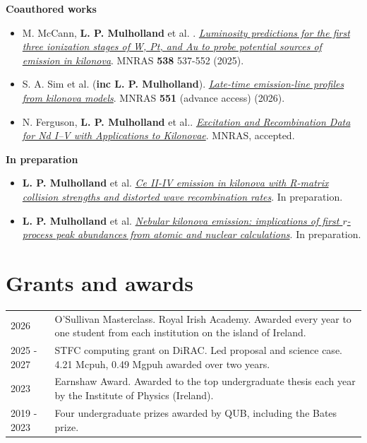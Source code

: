 \documentclass[a4paper,11pt]{article}
\begin{document}
\textbf{Coauthored works}
\begin{itemize}[label=,leftmargin=0.1cm]
    	\item {M. McCann}, \textbf{ L. P. Mulholland} et al. . \href{https://doi.org/10.1093/mnras/stae2331}{\emph{Luminosity predictions for the first three ionization stages of W, Pt, and Au to probe potential sources of emission in kilonova}}. MNRAS \textbf{538} 537-552 (2025).
        
        \item {S. A. Sim} et al. (\textbf{inc L. P. Mulholland}). \href{https://doi.org/10.1093/mnras/stag1384}{\emph{Late-time emission-line profiles from kilonova models}}. MNRAS \textbf{551} (advance access) (2026).
        \item {N. Ferguson}, \textbf{L. P. Mulholland}  et al.. \href{https://academic.oup.com/mnras/advance-article/doi/10.1093/mnras/stag1586/8767110}{\emph{Excitation and Recombination Data for Nd I–V with Applications to Kilonovae}}. MNRAS, accepted.
\end{itemize}
\textbf{In preparation}
\begin{itemize}[label=,leftmargin=0.1cm]
    	\item \textbf{L. P. Mulholland} et al. \href{}{\emph{Ce II-IV emission in kilonova with R-matrix collision strengths and
distorted wave recombination rates}}. In preparation.
    	\item \textbf{L. P. Mulholland} et al. \href{}{\emph{Nebular kilonova emission: implications of first $r$-process peak
abundances from atomic and nuclear calculations}}. In preparation.
\end{itemize}


\section{Grants and awards}

\begin{tabularx}{\linewidth}{@{}l X@{}}
2026 & O'Sullivan Masterclass. Royal Irish Academy. Awarded every year to one student from each institution on the island of Ireland.\\
2025 - 2027 & STFC computing grant on DiRAC. Led proposal and science case. 4.21 Mcpuh, 0.49 Mgpuh awarded over two years. \\

2023  & Earnshaw Award. Awarded to the top undergraduate thesis each year by the Institute of Physics (Ireland). \\
2019 - 2023 & Four undergraduate prizes awarded by QUB, including the Bates prize.
\end{tabularx}
\end{document}
